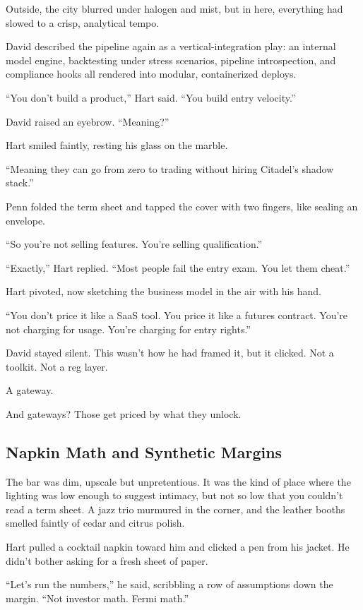 Outside, the city blurred under halogen and mist, but in here, everything had slowed to a crisp, analytical tempo.

David described the pipeline again as a vertical-integration play:  
an internal model engine, backtesting under stress scenarios, pipeline introspection, and compliance hooks all rendered 
into modular, containerized deploys.

“You don’t build a product,” Hart said. “You build entry velocity.”

David raised an eyebrow. “Meaning?”

Hart smiled faintly, resting his glass on the marble.

“Meaning they can go from zero to trading without hiring Citadel’s shadow stack.”

Penn folded the term sheet and tapped the cover with two fingers, like sealing an envelope.

“So you’re not selling features. You’re selling qualification.”

“Exactly,” Hart replied. “Most people fail the entry exam. You let them cheat.”

Hart pivoted, now sketching the business model in the air with his hand.

“You don’t price it like a SaaS tool. You price it like a futures contract.  
You’re not charging for usage. You’re charging for entry rights.”

David stayed silent. This wasn’t how he had framed it, but it clicked.  
Not a toolkit. Not a reg layer.

A gateway.

And gateways? Those get priced by what they unlock.



\subsection{Napkin Math and Synthetic Margins}

The bar was dim, upscale but unpretentious. It was the kind of place where the lighting was low enough to suggest intimacy, 
but not so low that you couldn’t read a term sheet. A jazz trio murmured in the corner, and the leather booths smelled 
faintly of cedar and citrus polish.

Hart pulled a cocktail napkin toward him and clicked a pen from his jacket. He didn’t bother asking for a fresh sheet of paper.

``Let’s run the numbers,'' he said, scribbling a row of assumptions down the margin. ``Not investor math. 
Fermi math.''


